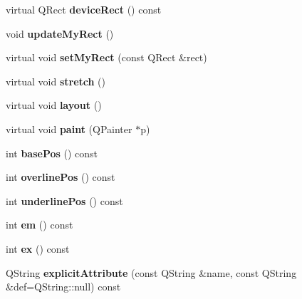 \begin{DoxyCompactItemize}
\mbox{\label{class_mml_node_abeb3234bd40a1b0b9dbd38fe9e032594}} 
virtual Q\+Rect {\bfseries device\+Rect} () const
\item 
\mbox{\label{class_mml_node_a37fcbe6501805a1b7c71706713accc49}} 
void {\bfseries update\+My\+Rect} ()
\item 
\mbox{\label{class_mml_node_a05c750d466a84fd3e9275db39e689d72}} 
virtual void {\bfseries set\+My\+Rect} (const Q\+Rect \&rect)
\item 
\mbox{\label{class_mml_node_a54c3a06c885ddcef727aaac473cd2199}} 
virtual void {\bfseries stretch} ()
\item 
\mbox{\label{class_mml_node_a6dae9e676ae4fa3be26b49d277c0b01f}} 
virtual void {\bfseries layout} ()
\item 
\mbox{\label{class_mml_node_a5122c8273f3efa3f5cd65ca37aeada06}} 
virtual void {\bfseries paint} (Q\+Painter $\ast$p)
\item 
\mbox{\label{class_mml_node_af34f5ddaf75ccbac911b40b57c27f15d}} 
int {\bfseries base\+Pos} () const
\item 
\mbox{\label{class_mml_node_a3d9d4ce80dc944587bbcc0787e57f170}} 
int {\bfseries overline\+Pos} () const
\item 
\mbox{\label{class_mml_node_affc1cbe1665f3d6ed2576512544fbf73}} 
int {\bfseries underline\+Pos} () const
\item 
\mbox{\label{class_mml_node_aa354dfdf92f98f8a30e6b8b21e71073e}} 
int {\bfseries em} () const
\item 
\mbox{\label{class_mml_node_a134c2211235d47342dfd7e6a7bc7c595}} 
int {\bfseries ex} () const
\item 
\mbox{\label{class_mml_node_a4076f58de278a7281a9dca8eab10c907}} 
Q\+String {\bfseries explicit\+Attribute} (const Q\+String \&name, const Q\+String \&def=Q\+String\+::null) const
\item 

\end{DoxyCompactItemize}
